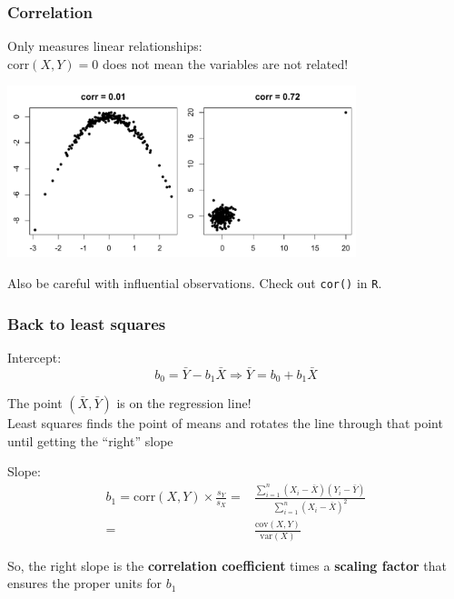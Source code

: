 \documentclass{beamer}
\newcommand{\rd}{\color{burntorange}}
\newcommand{\bk}{\color{black}}
\begin{document}
\begin{frame}
\frametitle{Correlation}

Only measures \rd linear \bk relationships: \\ \vspace{3mm} corr$(X,Y) =0 $ does not
mean the variables are not related!

\begin{center}
\includegraphics[width=4in]{figures/strangecor}
\end{center}
Also be careful with influential observations.  Check out {\tt cor()} in {\tt R}.

\end{frame}
\begin{frame}
\frametitle{Back to least squares}

{\color{lightblue} Intercept:}
$$
b_0 = \bar{Y} -b_1 \bar{X} \Rightarrow \bar{Y} = b_0 + b_1 \bar{X} 
$$


The point $(\bar{X},\bar{Y})$ is on the regression line! \\ \vspace{2mm}
Least squares finds the point of means and rotates the line through that point until getting the ``right'' slope

\vspace{2mm}
{\color{lightblue}Slope:}
\begin{equation*}
\begin{split}
b_1 = \text{corr}(X,Y) \times \frac{s_Y}{s_X} =&  \frac{\sum_{i=1}^n (X_i - \bar{X})(Y_i -
  \bar{Y})}{\sum_{i=1}^n (X_i - \bar{X})^2} \\
   =& \frac{\text{cov}(X,Y)}{\text{var}(X)}	
\end{split}
\end{equation*} \vspace{2mm}


So, the right slope is the {\color{burntorange} \bf correlation coefficient} times a {\color{burntorange} \bf scaling factor} that ensures the proper units for $b_1$

\end{frame}
\end{document}
